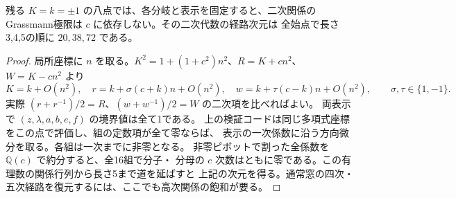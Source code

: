 \begin{proposition}
残る $K=k=\pm1$ の八点では、各分岐と表示を固定すると、二次関係の
Grassmann極限は $c$ に依存しない。その二次代数の経路次元は
全始点で長さ3,4,5の順に $20,38,72$ である。
\end{proposition}
\begin{proof}
局所座標に $n$ を取る。$K^2=1+(1+c^2)n^2$、$R=K+cn^2$、$W=K-cn^2$ より
\[
 K=k+O(n^2),\quad r=k+\sigma(c+k)n+O(n^2),\quad
 w=k+\tau(c-k)n+O(n^2),\qquad \sigma,\tau\in\{1,-1\}.
\]
実際 $(r+r^{-1})/2=R$、$(w+w^{-1})/2=W$ の二次項を比べればよい。
両表示で $(z,\lambda,a,b,e,f)$ の境界値は全て1である。
上の検証コードは同じ多項式座標をこの点で評価し、組の定数項が全て零ならば、
表示の一次係数に沿う方向微分を取る。各組は一次までに非零となる。
非零ピボットで割った全係数を $\mathbb Q(c)$ で約分すると、全16組で分子・
分母の $c$ 次数はともに零である。この有理数の関係行列から長さ5まで道を延ばすと
上記の次元を得る。通常窓の四次・五次経路を復元するには、ここでも高次関係の飽和が要る。
\end{proof}
